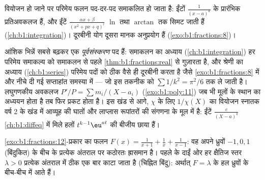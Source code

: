 \begin{remark}[यह किस काम आता है]
वियोजन हो जाने पर परिमेय फलन पद-दर-पद समाकलित हो जाता है: ईंटों
$\frac{1}{(x-a)^k}$ के प्रारंभिक प्रतिअवकलज हैं, और ईंटें $\frac{\alpha x +
\beta}{(x^2 + px + q)^l}$ $\ln$ तथा $\arctan$ तक सिमट जाती हैं
(\cref{ch:b1:integration})। दूरबीनी योग दूसरा मानक अनुप्रयोग हैं
(\cref{exo:b1:fractions:8})।
\end{remark}

\begin{remark}[यह अध्याय कहाँ काम आता है]\label{rem:b1:fractions:whereused}
आंशिक भिन्नें सबसे बढ़कर एक \emph{पूर्वसंस्करण} पद हैं: समाकलन का अध्याय
(\cref{ch:b1:integration}) हर परिमेय समाकल्य को समाकलन से पहले
\cref{thm:b1:fractions:real} से गुज़ारता है, और श्रेणी का अध्याय
(\cref{ch:b1:series}) परिमेय पदों को ठीक वैसे ही दूरबीनी करता है जैसे
\cref{exo:b1:fractions:8} में और नीचे दी गई सप्ताहांत समस्या में --- जो इस
तकनीक को $\sum 1/k^2 = \pi^2/6$ तक ले जाती है। लघुगणकीय अवकलज $P'/P = \sum
m_i/(X - a_i)$ (\cref{exo:b1:poly:11}) जब भी मूलों के स्थान का अध्ययन होता
है तब फिर प्रकट होता है। इस खंड से आगे,  $\chi$ के लिए
$1/\chi(X)$ का वियोजन स्नातक वर्ष 2 के खंड में आव्यूह की घातों और लाप्लास
रूपांतरों की संगणना के मूल में है: ईंटें $\frac{c}{(X - a)^k}$
\cref{ch:b1:diffeq} में मिले हलों $t^{k-1}\eu^{at}$ की बीजीय छाया हैं।
\end{remark}

\begin{omfigure}

{\small \cref{exo:b1:fractions:12}-प्रकार का फलन $F(x) = \frac1{x+1} +
\frac1x + \frac1{x-1}$: वह अपने ध्रुवों $-1, 0, 1$ (बिंदुकित) के बीच के
प्रत्येक अंतराल पर कठोरतः ह्रासमान है। पहले  के दाईं ओर हर क्षैतिज स्तर
$\lambda > 0$ प्रत्येक अंतराल में ठीक एक बार काटा जाता है (चिह्नित बिंदु):
अर्थात् $F = \lambda$ के हल ध्रुवों के बीच-बीच में आते हैं।}
\end{omfigure}

